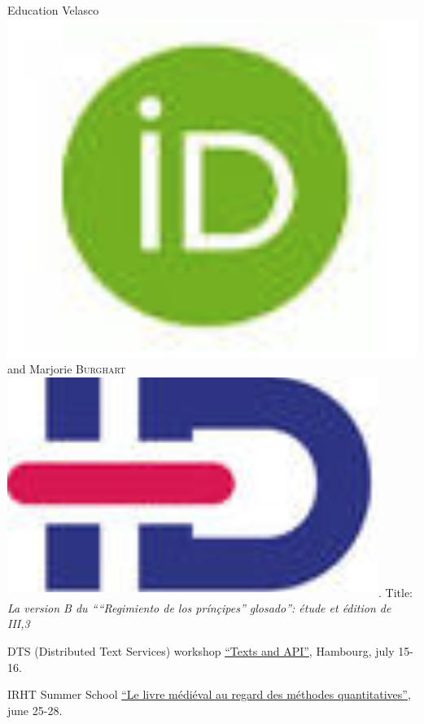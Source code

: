 \begin{rubric}{Education}
{                                Velasco}\href{https://orcid.org/0000-0002-3848-9230}{\includegraphics[scale=0.025]{img/orcid.png}} and Marjorie \textsc{Burghart}\href{https://www.idref.fr/178995819}{\textsuperscript{\includegraphics[scale=0.025]{img/idref.png}}}. Title:
                            \textit{La version B du ````Regimiento de
                                    los prínçipes'' glosado'': étude
                            et édition de III,3}
                    
                                \entry*
                             DTS (Distributed Text Services) workshop \href{https://distributed-text-services.github.io/workshops/events/2019-hamburg/}{\enquote{Texts and API}}, Hambourg, july
                        15-16.
                    
                                \entry*
                            IRHT Summer School \href{https://www.irht.cnrs.fr/?q=fr/agenda/le-livre-medieval-au-regard-des-methodes-quantitatives-0}{\enquote{Le livre médiéval au regard des méthodes
                                quantitatives}}, june
                        25-28.
                    

\end{rubric}
